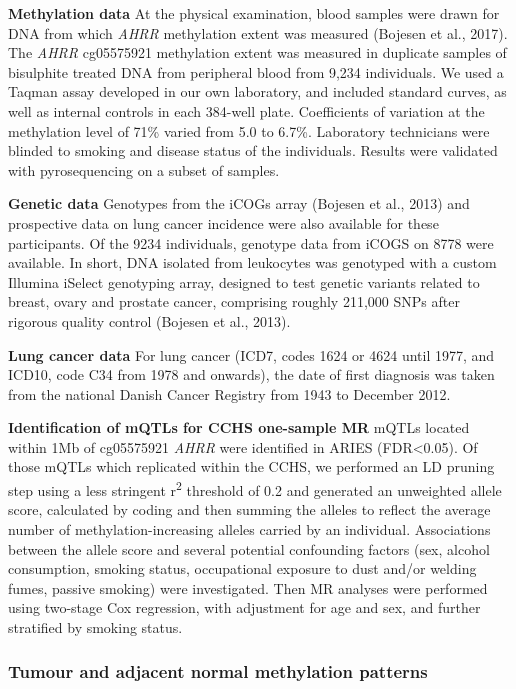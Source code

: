 \documentclass[11pt,twoside]{bristolthesis}
\begin{document}
\textbf{Methylation data}
At the physical examination, blood samples were drawn for DNA from which \emph{AHRR} methylation extent was measured (Bojesen et al., 2017). The \emph{AHRR} cg05575921 methylation extent was measured in duplicate samples of bisulphite treated DNA from peripheral blood from 9,234 individuals. We used a Taqman assay developed in our own laboratory, and included standard curves, as well as internal controls in each 384-well plate. Coefficients of variation at the methylation level of 71\% varied from 5.0 to 6.7\%. Laboratory technicians were blinded to smoking and disease status of the individuals. Results were validated with pyrosequencing on a subset of samples.

\textbf{Genetic data}
Genotypes from the iCOGs array (Bojesen et al., 2013) and prospective data on lung cancer incidence were also available for these participants. Of the 9234 individuals, genotype data from iCOGS on 8778 were available. In short, DNA isolated from leukocytes was genotyped with a custom Illumina iSelect genotyping array, designed to test genetic variants related to breast, ovary and prostate cancer, comprising roughly 211,000 SNPs after rigorous quality control (Bojesen et al., 2013).

\textbf{Lung cancer data}
For lung cancer (ICD7, codes 1624 or 4624 until 1977, and ICD10, code C34 from 1978 and onwards), the date of first diagnosis was taken from the national Danish Cancer Registry from 1943 to December 2012.

\textbf{Identification of mQTLs for CCHS one-sample MR}
mQTLs located within 1Mb of cg05575921 \emph{AHRR} were identified in ARIES (FDR\textless0.05). Of those mQTLs which replicated within the CCHS, we performed an LD pruning step using a less stringent r\textsuperscript{2} threshold of 0.2 and generated an unweighted allele score, calculated by coding and then summing the alleles to reflect the average number of methylation-increasing alleles carried by an individual. Associations between the allele score and several potential confounding factors (sex, alcohol consumption, smoking status, occupational exposure to dust and/or welding fumes, passive smoking) were investigated. Then MR analyses were performed using two-stage Cox regression, with adjustment for age and sex, and further stratified by smoking status.

\hypertarget{tumour-and-adjacent-normal-methylation-patterns}{%
\subsubsection{Tumour and adjacent normal methylation patterns}\label{tumour-and-adjacent-normal-methylation-patterns}}
\end{document}
